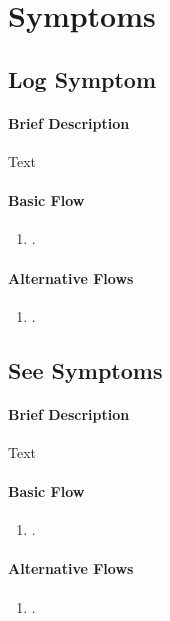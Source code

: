 \documentclass{report}
\begin{document}
\vspace{1em}
\section{Symptoms}
\subsection{Log Symptom}
\paragraph{Brief Description}
Text

\begin{multicols}{2}
    \paragraph{Basic Flow}
    \begin{enumerate}
        \item .
    \end{enumerate}
    \columnbreak

    \paragraph{Alternative Flows}
    \begin{enumerate}[label=A\arabic*.]
        \item .
    \end{enumerate}
\end{multicols}

\vspace{1em}
\subsection{See Symptoms}
\paragraph{Brief Description}
Text

\begin{multicols}{2}
    \paragraph{Basic Flow}
    \begin{enumerate}
        \item .
    \end{enumerate}
    \columnbreak

    \paragraph{Alternative Flows}
    \begin{enumerate}[label=A\arabic*.]
        \item .
    \end{enumerate}
\end{multicols}
\end{document}
